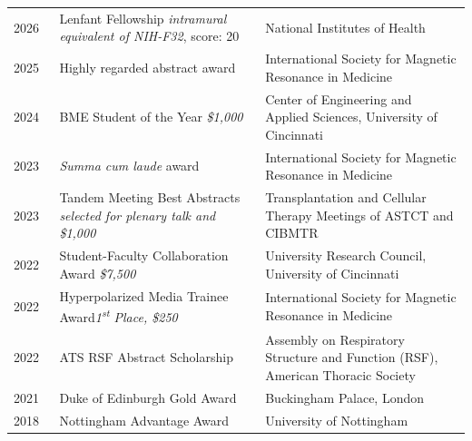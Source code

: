 \documentclass[12pt,]{scrartcl}
\begin{document}
\begin{table}[!h]
{\def\arraystretch{1.5}\tabcolsep=0pt
\begin{tabular}{p{0.10\linewidth}p{0.45\linewidth}p{0.45\linewidth}}
    2026 & Lenfant Fellowship \newline \textit{intramural equivalent of NIH-F32}, score: 20 & National Institutes of Health \\
    
    2025 & Highly regarded abstract award  & International Society for Magnetic Resonance in Medicine \\

    2024 & BME Student of the Year \newline \textit{\$1,000}  & Center of Engineering and Applied Sciences, University of Cincinnati \\
    
    2023 & \textit{Summa cum laude} award & International Society for Magnetic Resonance in Medicine \\

    
    2023 & Tandem Meeting Best Abstracts \newline \textit{selected for plenary talk and \$1,000}  & Transplantation and Cellular Therapy \newline Meetings of ASTCT and CIBMTR \\
    
    2022 & Student-Faculty Collaboration Award \newline \textit{\$7,500} & University Research Council, University of Cincinnati \\
    
    2022 & Hyperpolarized Media Trainee Award\newline \textit{1\textsuperscript{st} Place, \$250} & International Society for Magnetic Resonance in Medicine \\
    
    
    2022 & ATS RSF Abstract Scholarship & Assembly on Respiratory Structure and Function (RSF), American Thoracic Society \\ 

  
  2021 & Duke of Edinburgh Gold Award & Buckingham Palace, London \\
  
  2018 & Nottingham Advantage Award & University of Nottingham \\

\end{tabular}%
}
\end{table}
\end{document}
